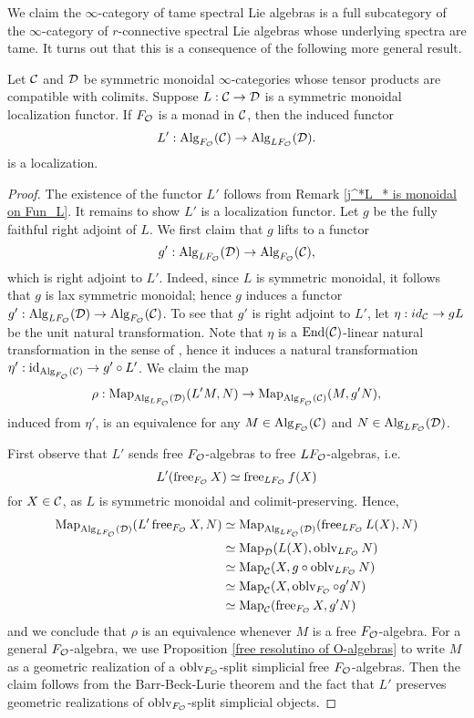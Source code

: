 We claim the $\infty$-category of tame spectral Lie algebras is a full subcategory of the $\infty$-category of $r$-connective spectral Lie algebras whose underlying spectra are tame. It turns out that this is a consequence of the following more general result.
\begin{proposition}
\label{Lifting localization to algebra category}
Let ${\mathcal{C}}$ and ${\mathcal{D}}$ be symmetric monoidal $\infty$-categories whose tensor products are compatible with colimits.
Suppose $L:{\mathcal{C}} \to {\mathcal{D}}$ is a symmetric monoidal localization functor.
If $F_{\mathcal{O}}$ is a monad in ${\mathcal{C}}$, then the induced functor
$$
L' : \operatorname{Alg}_{F_{\mathcal{O}}}({\mathcal{C}}) \to \operatorname{Alg}_{LF_{\mathcal{O}}}({\mathcal{D}}).
$$
is a localization.
\end{proposition}
\begin{proof}
	The existence of the functor $L'$ follows from Remark \ref{j^*L_* is monoidal on Fun_L}. It remains to show $L'$ is a localization functor. Let $g$ be the fully faithful right adjoint of $L$. We first claim that $g$ lifts to a functor 
	$$
	g': \operatorname{Alg}_{LF_{\mathcal{O}}}({\mathcal{D}})
	\to 
	\operatorname{Alg}_{F_{\mathcal{O}}}({\mathcal{C}}),
	$$
	which is right adjoint to $L'$. 
	Indeed, since $L$ is symmetric monoidal, it follows that $g$ is lax symmetric monoidal; hence $g$ induces a functor $g': \operatorname{Alg}_{LF_{\mathcal{O}}}({\mathcal{D}})
	\to 
	\operatorname{Alg}_{F_{\mathcal{O}}}({\mathcal{C}})$.
	To see that $g'$ is right adjoint to $L'$, let $\eta: id_{{\mathcal{C}}} \to gL$ be the unit natural transformation.
	Note that $\eta$ is a $\operatorname{End}({\mathcal{C}})$-linear natural transformation in the sense of \cite[Definition 4.6.2.7.]{HA}, hence it induces a natural transformation $\eta': \operatorname{id}_{\operatorname{Alg}_{F_{{\mathcal{O}}}}({\mathcal{C}})} \to g'\circ L'$.
	We claim the map
	$$
	\rho:
	\operatorname{Map}_{\operatorname{Alg}_{LF_{\mathcal{O}}}({\mathcal{D}})}(L'M, N)
	\to 
	\operatorname{Map}_{\operatorname{Alg}_{F_{\mathcal{O}}}({\mathcal{C}})}(M, g'N),
	$$
	induced from $\eta'$,
	is an equivalence for any $M\in \operatorname{Alg}_{F_{\mathcal{O}}}({\mathcal{C}})$ and $N\in \operatorname{Alg}_{LF_{\mathcal{O}}}({\mathcal{D}})$. 
	
	First observe that $L'$ sends free $F_{\mathcal{O}}$-algebras to free $LF_{{\mathcal{O}}}$-algebras, i.e.
	$$
	L'(\operatorname{free}_{F_{{\mathcal{O}}}} X)\simeq \operatorname{free}_{LF_{{\mathcal{O}}}} f(X)
	$$
	for $X\in {\mathcal{C}}$,
	as $L$ is symmetric monoidal and colimit-preserving. 
	Hence, 
    \begin{align*}
        \operatorname{Map}_{\operatorname{Alg}_{LF_{{\mathcal{O}}}}({\mathcal{D}})}(L'\operatorname{free}_{F_{{\mathcal{O}}}} X, N) & \simeq \operatorname{Map}_{\operatorname{Alg}_{LF_{{\mathcal{O}}}}({\mathcal{D}})}(\operatorname{free}_{LF_{{\mathcal{O}}}} L(X), N)\\
        & \simeq \operatorname{Map}_{{\mathcal{D}}}(L(X), \operatorname{oblv}_{LF_{{\mathcal{O}}}}N)\\
        & \simeq \operatorname{Map}_{{\mathcal{C}}}(X, g \circ \operatorname{oblv}_{LF_{{\mathcal{O}}}}N)\\
        & \simeq \operatorname{Map}_{{\mathcal{C}}}(X, \operatorname{oblv}_{F_{{\mathcal{O}}}}\circ g' N)\\
        & \simeq \operatorname{Map}_{{\mathcal{C}}}(\operatorname{free}_{F_{{\mathcal{O}}}}  X, g' N)
    \end{align*}	
    and we conclude that
	$\rho$ is an equivalence whenever $M$ is a free $F_{{\mathcal{O}}}$-algebra. For a general $F_{{\mathcal{O}}}$-algebra, we use Proposition \ref{free resolutino of O-algebras} to write $M$ as a geometric realization of a $\operatorname{oblv}_{F_{{\mathcal{O}}}}$-split simplicial free $F_{{\mathcal{O}}}$-algebras. Then the claim follows from the Barr-Beck-Lurie theorem \cite[Theorem 4.7.3.5.]{HA} and the fact that $L'$ preserves geometric realizations of $\operatorname{oblv}_{F_{{\mathcal{O}}}}$-split simplicial objects.
	

\end{proof}
